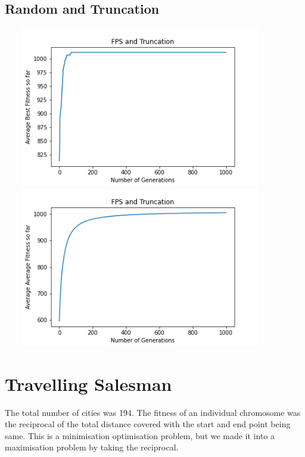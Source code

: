 \documentclass[a4paper]{article}
\begin{document}
\subsection{Random and Truncation}
\includegraphics[width=12cm, height=7cm]{Graphs/KnapSack/fps_trunc_bsf.png} \\
\includegraphics[width=12cm, height=7cm]{Graphs/KnapSack/fps_trunc_avg.png} \\


\section{Travelling Salesman}
The total number of cities was 194. The fitness of an individual chromosome was the reciprocal of the total distance covered with the start and end point being same. 
This is a minimisation optimisation problem, but we made it into a maximisation problem by taking the reciprocal.
\end{document}

